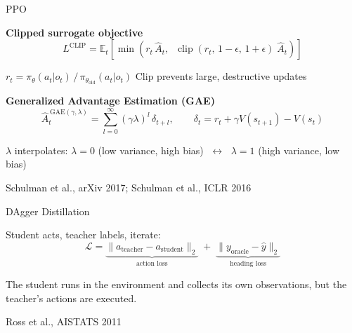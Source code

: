\documentclass[aspectratio=169,10pt]{beamer}
\newcommand{\source}[1]{\vfill{\tiny\color{gray}#1\par}}
\newcommand{\E}{\mathbb{E}}
\DeclareMathOperator{\clip}{clip}
\begin{document}
\begin{frame}{PPO}

	\textbf{Clipped surrogate objective}
	\[
		L^{\mathrm{CLIP}} = \E_t\!\left[\min\!\left(
			r_t\,\hat{A}_t,\;\;
			\clip(r_t,\, 1{-}\epsilon,\, 1{+}\epsilon)\;\hat{A}_t
			\right)\right]
	\]

	\vspace{4pt}
	{\small $r_t = \pi_\theta(a_t|o_t)\,/\,\pi_{\theta_\mathrm{old}}(a_t|o_t)$ \hfill
		Clip prevents large, destructive updates}

	\vspace{14pt}

	\textbf{Generalized Advantage Estimation (GAE)}
	\[
		\hat{A}_t^{\,\mathrm{GAE}(\gamma,\lambda)}
		= \sum_{l=0}^{\infty} (\gamma\lambda)^l\,\delta_{t+l},
		\qquad
		\delta_t = r_t + \gamma V(s_{t+1}) - V(s_t)
	\]

	\vspace{4pt}
	{\small $\lambda$ interpolates: $\lambda{=}0$ (low variance, high bias)
		$\;\leftrightarrow\;$ $\lambda{=}1$ (high variance, low bias)}

	\source{Schulman et al., arXiv 2017; Schulman et al., ICLR 2016}
\end{frame}

\begin{frame}{DAgger Distillation}


	Student acts, teacher labels, iterate:
	\[
		\mathcal{L} =
		\underbrace{\|a_\mathrm{teacher} - a_\mathrm{student}\|_2}_{\text{action loss}}
		\;+\;
		\underbrace{\|y_\mathrm{oracle} - \hat{y}\|_2}_{\text{heading loss}}
	\]

	\vspace{10pt}

	{\small The student runs in the environment and collects its own observations,
		but the teacher's actions are executed.}

	\source{Ross et al., AISTATS 2011}
\end{frame}
\end{document}
